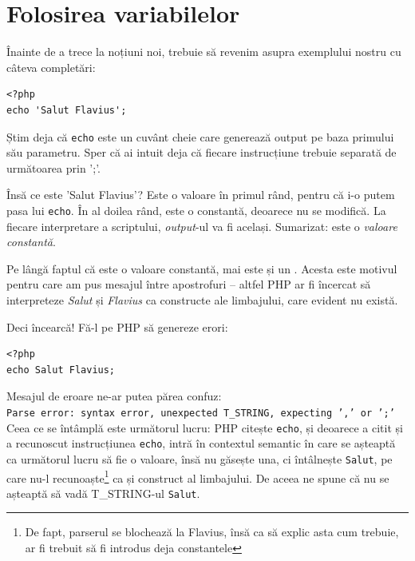 \section{Folosirea variabilelor}
Înainte de a trece la noțiuni noi, trebuie să revenim asupra exemplului nostru
cu câteva completări:
\begin{lstlisting}
<?php
echo 'Salut Flavius';
\end{lstlisting}
Știm deja că \texttt{echo} este un cuvânt cheie care generează output pe baza
primului său parametru. Sper că ai intuit deja că fiecare instrucțiune
trebuie separată de următoarea prin ';'.

Însă ce este 'Salut Flavius'? Este o valoare în primul rând, pentru că
i-o putem pasa lui \texttt{echo}. În al doilea rând, este o constantă,
deoarece nu se modifică. La fiecare interpretare a scriptului, \textit{output}-ul
va fi același. Sumarizat: este o \textsl{valoare constantă}.

Pe lângă faptul că este o valoare constantă, mai este și un .
Acesta este motivul pentru care
am pus mesajul între apostrofuri -- altfel PHP ar fi încercat să
interpreteze \textsl{Salut} și \textsl{Flavius} ca constructe ale limbajului,
care evident nu există.


Deci încearcă! Fă-l pe PHP să genereze erori:
\begin{lstlisting}
<?php
echo Salut Flavius;
\end{lstlisting}
Mesajul de eroare ne-ar putea părea confuz:\\
\texttt{Parse error: syntax error, unexpected T\_STRING, expecting ',' or ';'}\\
Ceea ce se întâmplă este următorul lucru: PHP citește \texttt{echo}, și deoarece a citit
și a recunoscut instrucțiunea \texttt{echo}, intră în contextul semantic în care se așteaptă ca următorul
lucru să fie o valoare, însă nu găsește una, ci întâlnește \texttt{Salut},
pe care nu-l recunoaște\footnote{De fapt, parserul se blochează la {\glqq}Flavius{\grqq}, însă
ca să explic asta cum trebuie, ar fi trebuit să fi introdus deja constantele}
ca și construct al limbajului.
De aceea ne spune că nu se așteaptă să vadă T\_STRING-ul \texttt{Salut}.

